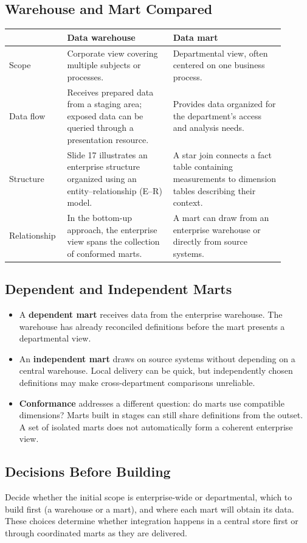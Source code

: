 \documentclass[12pt,a4paper]{article}
\newcommand{\rowgap}{\\[4pt]}
\begin{document}
\subsection{Warehouse and Mart Compared}
\begin{center}\small
\begin{tabular}{@{}p{0.16\linewidth}p{0.36\linewidth}p{0.38\linewidth}@{}}\hline
 & \textbf{Data warehouse} & \textbf{Data mart}\\ \hline
Scope & Corporate view covering multiple subjects or processes. & Departmental view, often centered on one business process.\rowgap
Data flow & Receives prepared data from a staging area; exposed data can be queried through a presentation resource. & Provides data organized for the department's access and analysis needs.\rowgap
Structure & Slide 17 illustrates an enterprise structure organized using an entity--relationship (E--R) model. & A star join connects a fact table containing measurements to dimension tables describing their context.\rowgap
Relationship & In the bottom-up approach, the enterprise view spans the collection of conformed marts. & A mart can draw from an enterprise warehouse or directly from source systems.\\ \hline
\end{tabular}
\end{center}

\subsection{Dependent and Independent Marts}
\begin{itemize}
\item A \textbf{dependent mart} receives data from the enterprise warehouse. The warehouse has already reconciled definitions before the mart presents a departmental view.
\item An \textbf{independent mart} draws on source systems without depending on a central warehouse. Local delivery can be quick, but independently chosen definitions may make cross-department comparisons unreliable.
\item \textbf{Conformance} addresses a different question: do marts use compatible dimensions? Marts built in stages can still share definitions from the outset. A set of isolated marts does not automatically form a coherent enterprise view.
\end{itemize}

\subsection{Decisions Before Building}
Decide whether the initial scope is enterprise-wide or departmental, which to build first (a warehouse or a mart), and where each mart will obtain its data. These choices determine whether integration happens in a central store first or through coordinated marts as they are delivered.
\end{document}
